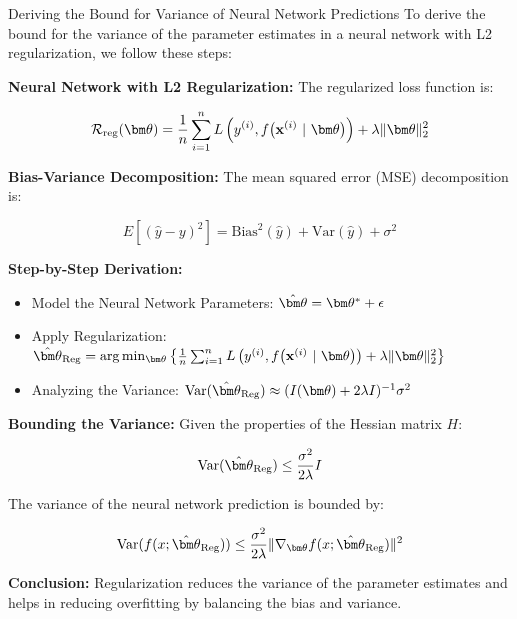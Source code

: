 \documentclass[11pt,compress,t,notes=noshow, xcolor=table]{beamer}
\begin{document}
\begin{vbframe}{Deriving the Bound for Variance of Neural Network Predictions}
To derive the bound for the variance of the parameter estimates in a neural network with L2 regularization, we follow these steps:

\textbf{Neural Network with L2 Regularization:}
The regularized loss function is:

\[
\riskrt = \frac{1}{n} \sum_{i=1}^{n} \Lxyit + \lambda \|\thetav\|_2^2
\]

\textbf{Bias-Variance Decomposition:}
The mean squared error (MSE) decomposition is:

\[
E[(\hat{y} - y)^2] = \text{Bias}^2(\hat{y}) + \text{Var}(\hat{y}) + \sigma^2
\]

\textbf{Step-by-Step Derivation:}
\begin{itemize}
    \item Model the Neural Network Parameters: \( \hat{\thetav} = \thetav^* + \epsilon \)
    \item Apply Regularization: \( \hat{\thetav}_{\text{Reg}} = \arg \min_{\thetav} \left\{ \frac{1}{n} \sum_{i=1}^{n} \Lxyit + \lambda \|\thetav\|_2^2 \right\} \)
    \item Analyzing the Variance: \( \text{Var}(\hat{\thetav}_{\text{Reg}}) \approx (I(\thetav) + 2\lambda I)^{-1} \sigma^2 \)
\end{itemize}

\textbf{Bounding the Variance:}
Given the properties of the Hessian matrix \(H\):

\[
\text{Var}(\hat{\thetav}_{\text{Reg}}) \leq \frac{\sigma^2}{2\lambda} I
\]

The variance of the neural network prediction is bounded by:

\[
\text{Var}(f(x; \hat{\thetav}_{\text{Reg}})) \leq \frac{\sigma^2}{2\lambda} \|\nabla_{\thetav} f(x; \hat{\thetav}_{\text{Reg}})\|^2
\]

\textbf{Conclusion:}
Regularization reduces the variance of the parameter estimates and helps in reducing overfitting by balancing the bias and variance.
\end{vbframe}
\end{document}
